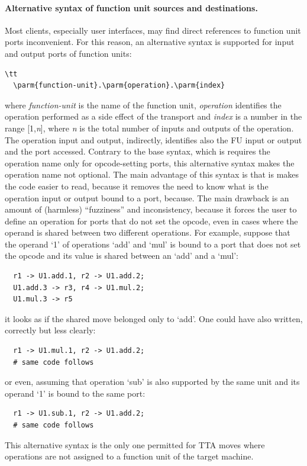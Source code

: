 \documentclass[twoside]{tceusermanual}
\begin{document}
\paragraph{Alternative syntax of function unit sources and destinations.}
Most clients, especially user interfaces, may find direct references to
function unit ports inconvenient. For this reason, an alternative syntax is
supported for input and output ports of function units:
\begin{verbatim}\tt
  \parm{function-unit}.\parm{operation}.\parm{index}
\end{verbatim}
where \emph{function-unit} is the name of the function unit,
\emph{operation} identifies the operation performed as a side effect of the
transport and \emph{index} is a number in the range [1,\emph{n}], where
\emph{n} is the total number of inputs and outputs of the operation.
%
The operation input and output, indirectly, identifies also the FU input or
output and the port accessed.  Contrary to the base syntax, which is
requires the operation name only for opcode-setting ports, this alternative
syntax makes the operation name not optional.
%
The main advantage of this syntax is that is makes the code easier to read,
because it removes the need to know what is the operation input or output
bound to a port, because.  The main drawback is an amount of (harmless)
``fuzziness'' and inconsistency, because it forces the user to define an
operation for ports that do not set the opcode, even in cases where the
operand is shared between two different operations.  For example, suppose
that the operand `1' of operations `add' and `mul' is bound to a port that
does not set the opcode and its value is shared between an `add' and a
`mul':
\begin{verbatim}
  r1 -> U1.add.1, r2 -> U1.add.2;
  U1.add.3 -> r3, r4 -> U1.mul.2;
  U1.mul.3 -> r5
\end{verbatim}
it looks as if the shared move belonged only to `add'. One could have also
written, correctly but less clearly:
\begin{verbatim}
  r1 -> U1.mul.1, r2 -> U1.add.2;
  # same code follows
\end{verbatim}
or even, assuming that operation `sub' is also supported by the same unit
and its operand `1' is bound to the same port:
\begin{verbatim}
  r1 -> U1.sub.1, r2 -> U1.add.2;
  # same code follows
\end{verbatim}

This alternative syntax is the only one permitted for TTA moves where
operations are not assigned to a function unit of the target machine.
\end{document}
